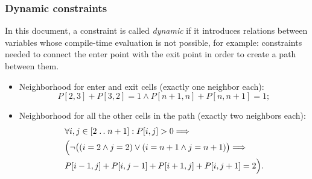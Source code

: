 \documentclass[12pt]{article}
\newcommand*{\itc}{\mathrel{:}} %
\newcommand*{\twodots}{\mathrel{. \, .}}
\begin{document}
\subsubsection{Dynamic constraints}
In this document, a constraint is called \emph{dynamic} if it introduces
relations between variables whose compile-time evaluation is not possible,
for example:
constraints needed to connect the enter point with the exit point in order to
create a path between them.
\begin{itemize}
  \item
  Neighborhood for enter and exit cells (exactly one neighbor each):
  \[
    P[2,3] + P[3,2] = 1 \wedge P[n+1,n] + P[n,n+1] = 1;
  \]
  \item
  Neighborhood for all the other cells in the path (exactly two neighbors each):
  \begin{align*}
    &\forall i,j \in [2 \twodots n+1] \itc
    P[i, j] > 0 \Longrightarrow\\
    &\Bigl(
    \neg \bigl( (i = 2 \wedge j = 2) \vee ( i = n+1 \wedge j = n+1) \bigr)
    \Longrightarrow \\
    & P[i-1,j] + P[i,j-1] + P[i+1,j] + P[i,j+1] = 2
    \Bigr).
  \end{align*}
\end{itemize}
\end{document}
